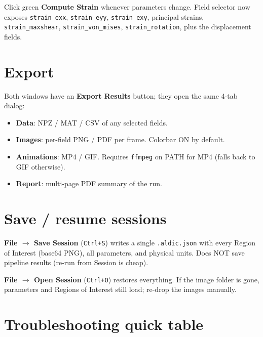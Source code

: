 \documentclass[10pt,letterpaper,twocolumn]{article}
\begin{document}
Click green \textbf{Compute Strain} whenever parameters change.
Field selector now exposes \texttt{strain\_exx},
\texttt{strain\_eyy}, \texttt{strain\_exy}, principal strains,
\texttt{strain\_maxshear}, \texttt{strain\_von\_mises},
\texttt{strain\_rotation}, plus the displacement fields.

\section{Export}

Both windows have an \textbf{Export Results} button; they open the
same 4-tab dialog:

\begin{itemize}
  \item \textbf{Data}: NPZ / MAT / CSV of any selected fields.
  \item \textbf{Images}: per-field PNG / PDF per frame. Colorbar
        ON by default.
  \item \textbf{Animations}: MP4 / GIF. Requires \texttt{ffmpeg}
        on PATH for MP4 (falls back to GIF otherwise).
  \item \textbf{Report}: multi-page PDF summary of the run.
\end{itemize}

\section{Save / resume sessions}

\textbf{File $\to$ Save Session} (\texttt{Ctrl+S}) writes a single
\texttt{.aldic.json} with every Region of Interest (base64 PNG),
all parameters, and physical units. Does NOT save pipeline results
(re-run from Session is cheap).

\textbf{File $\to$ Open Session} (\texttt{Ctrl+O}) restores
everything. If the image folder is gone, parameters and Regions of
Interest still load; re-drop the images manually.

\section{Troubleshooting quick table}
\end{document}
